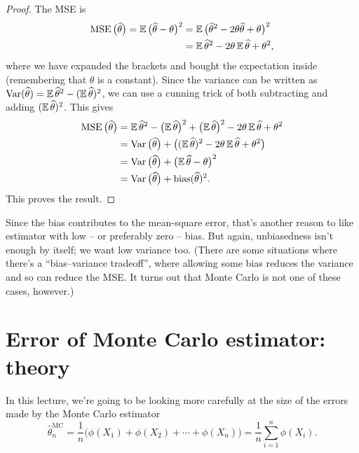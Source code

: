 \documentclass[
  letterpaper,
  DIV=11,
  numbers=noendperiod]{scrreprt}
\theoremstyle{plain}
\theoremstyle{definition}
\theoremstyle{definition}
\theoremstyle{remark}
\begin{document}
\begin{proof}
The MSE is \begin{align}
  \operatorname{MSE}\big(\widehat\theta\big) = \operatorname{\mathbb{E}}\big(\widehat\theta - \theta\big)^2
    &= \operatorname{\mathbb{E}} \big(\widehat\theta^2 - 2\theta\widehat\theta + \theta\big)^2 \\
    &= \operatorname{\mathbb{E}} \widehat\theta^2 - 2\theta \operatorname{\mathbb{E}} \widehat\theta + \theta^2 ,
\end{align} where we have expanded the brackets and bought the
expectation inside (remembering that \(\theta\) is a constant). Since
the variance can be written as
\(\operatorname{Var}(\widehat\theta) = \operatorname{\mathbb{E}}\widehat\theta^2 - (\operatorname{\mathbb{E}} \widehat\theta)^2\),
we can use a cunning trick of both subtracting and adding
\((\operatorname{\mathbb{E}} \widehat\theta)^2\). This gives \begin{align}
\operatorname{MSE}\big(\widehat\theta\big)
  &= \operatorname{\mathbb{E}} \widehat\theta^2 - \big(\!\operatorname{\mathbb{E}} \widehat\theta\big)^2 + \big(\!\operatorname{\mathbb{E}} \widehat\theta\big)^2 - 2\theta \operatorname{\mathbb{E}} \widehat\theta + \theta^2 \\
  &= \operatorname{Var}\big(\widehat\theta\big) + \big( (\operatorname{\mathbb{E}} \widehat\theta)^2 - 2\theta \operatorname{\mathbb{E}} \widehat\theta + \theta^2 \big) \\
  &= \operatorname{Var}\big(\widehat\theta\big) + \big( \! \operatorname{\mathbb{E}} \widehat\theta - \theta\big)^2 \\
  &= \operatorname{Var}\big(\widehat\theta\big) + \operatorname{bias}(\widehat\theta)^2 .
\end{align} This proves the result.
\end{proof}

Since the bias contributes to the mean-square error, that's another
reason to like estimator with low -- or preferably zero -- bias. But
again, unbiasedness isn't enough by itself; we want low variance too.
(There are some situations where there's a ``bias--variance tradeoff'',
where allowing some bias reduces the variance and so can reduce the MSE.
It turns out that Monte Carlo is not one of these cases, however.)

\section{Error of Monte Carlo estimator:
theory}\label{error-of-monte-carlo-estimator-theory}

In this lecture, we're going to be looking more carefully at the size of
the errors made by the Monte Carlo estimator
\[ \widehat{\theta}_n^{\mathrm{MC}} = \frac{1}{n} \big(\phi(X_1) + \phi(X_2) + \cdots + \phi(X_n) \big) = \frac{1}{n} \sum_{i=1}^n \phi(X_i) . \]
\end{document}
